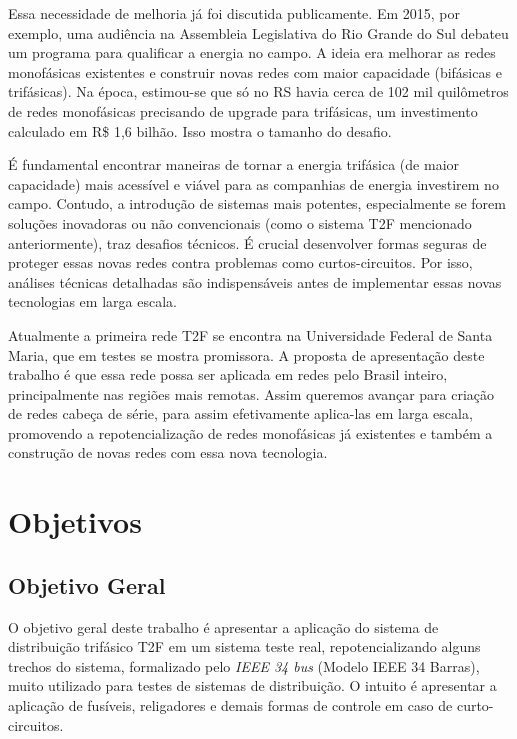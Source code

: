 \documentclass[oneside,openright,12pt]{ufsm_2021} %
\begin{document}
\par Essa necessidade de melhoria já foi discutida publicamente. Em 2015, por exemplo, uma audiência na Assembleia Legislativa do Rio Grande do Sul debateu um programa para qualificar a energia no campo. A ideia era melhorar as redes monofásicas existentes e construir novas redes com maior capacidade (bifásicas e trifásicas). Na época, estimou-se que só no RS havia cerca de 102 mil quilômetros de redes monofásicas precisando de upgrade para trifásicas, um investimento calculado em R\$ 1,6 bilhão. Isso mostra o tamanho do desafio.

\par É fundamental encontrar maneiras de tornar a energia trifásica (de maior capacidade) mais acessível e viável para as companhias de energia investirem no campo. Contudo, a introdução de sistemas mais potentes, especialmente se forem soluções inovadoras ou não convencionais (como o sistema T2F mencionado anteriormente), traz desafios técnicos. É crucial desenvolver formas seguras de proteger essas novas redes contra problemas como curtos-circuitos. Por isso, análises técnicas detalhadas são indispensáveis antes de implementar essas novas tecnologias em larga escala.

\par Atualmente a primeira rede T2F se encontra na Universidade Federal de Santa Maria, que em testes se mostra promissora. A proposta de apresentação deste trabalho é que essa rede possa ser aplicada em redes pelo Brasil inteiro, principalmente nas regiões mais remotas. Assim queremos avançar para criação de redes cabeça de série, para assim efetivamente aplica-las em larga escala, promovendo a repotencialização de redes monofásicas já existentes e também a construção de novas redes com essa nova tecnologia.

\section{Objetivos}
\subsection{Objetivo Geral}
\par O objetivo geral deste trabalho é apresentar a aplicação do sistema de distribuição trifásico T2F em um sistema teste real, repotencializando alguns trechos do sistema, formalizado pelo \textit{IEEE 34 bus} (Modelo IEEE 34 Barras), muito utilizado para testes de sistemas de distribuição. O intuito é apresentar a aplicação de fusíveis, religadores e demais formas de controle em caso de curto-circuitos.
\end{document}
